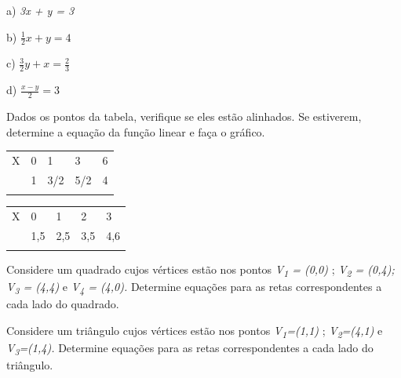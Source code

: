\begin{exercicios}
\begin{multicols}{2}
a) \textit{3x + y = 3}

b)  \( \frac{1}{2}x+y=4 \)

c)  \( \frac{3}{2}y+x=\frac{2}{3} \)

d)  \( \frac{x-y}{2}=3 \)
\end{multicols}

\exitem{} Dados os pontos da tabela, verifique se eles estão alinhados. Se estiverem, determine a equação da função linear e faça o gráfico.

\begin{multicols}{2}
\begin{table}[H]
\begin{tabular}{p{0.2in}p{0.18in}p{0.19in}p{0.16in}p{0.1in}}
\hline
\multicolumn{1}{|p{0.2in}}{X} & 
\multicolumn{1}{|p{0.18in}}{0} & 
\multicolumn{1}{|p{0.19in}}{1} & 
\multicolumn{1}{|p{0.16in}}{3} & 
\multicolumn{1}{|p{0.1in}|}{6} \\
\hhline{-----}
\multicolumn{1}{|p{0.2in}}{Y} & 
\multicolumn{1}{|p{0.18in}}{1} & 
\multicolumn{1}{|p{0.19in}}{3/2} & 
\multicolumn{1}{|p{0.16in}}{5/2} & 
\multicolumn{1}{|p{0.1in}|}{4} \\
\hhline{-----}
\end{tabular}
 \end{table}

\begin{table}[H]
\begin{tabular}{p{0.2in}p{0.18in}p{0.19in}p{0.16in}p{0.16in}}
\hline
\multicolumn{1}{|p{0.2in}}{X} & 
\multicolumn{1}{|p{0.18in}}{0} & 
\multicolumn{1}{|p{0.19in}}{1} & 
\multicolumn{1}{|p{0.16in}}{2} & 
\multicolumn{1}{|p{0.16in}|}{3} \\
\hhline{-----}
\multicolumn{1}{|p{0.2in}}{Y} & 
\multicolumn{1}{|p{0.18in}}{1,5} & 
\multicolumn{1}{|p{0.19in}}{2,5} & 
\multicolumn{1}{|p{0.16in}}{3,5} & 
\multicolumn{1}{|p{0.16in}|}{4,6} \\
\hhline{-----}
\end{tabular}
 \end{table}
\end{multicols}

\exitem{} Considere um quadrado cujos vértices estão nos pontos \textit{V\textsubscript{1} = (0,0)} ;   \textit{V\textsubscript{2} = (0,4);  V\textsubscript{3} = (4,4)}  e  \textit{V\textsubscript{4} = (4,0). }Determine equações para as retas correspondentes a cada lado do quadrado.

\exitem{} Considere um triângulo cujos vértices estão nos pontos \textit{V\textsubscript{1}=(1,1)} ; \textit{V\textsubscript{2}=(4,1) }e\textit{ V\textsubscript{3}=(1,4). }Determine equações para as retas correspondentes a cada lado do triângulo.


\end{exercicios}
